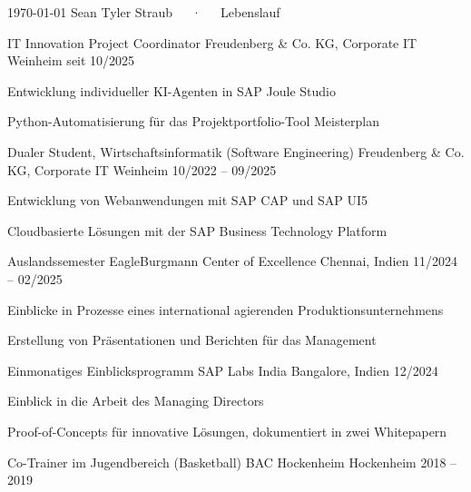 \documentclass[11pt, a4paper]{awesome-cv}
\begin{document}
\makecvheader[C]

\makecvfooter
  {\today}
  {Sean Tyler Straub~~~·~~~Lebenslauf}
  {\thepage}


\begin{cventries}

\cventry
  {IT Innovation Project Coordinator}
  {Freudenberg \& Co. KG, Corporate IT}
  {Weinheim}
  {seit 10/2025}
  {
    \begin{cvitems}
      \item {Entwicklung individueller KI-Agenten in SAP Joule Studio}
      \item {Python-Automatisierung für das Projektportfolio-Tool Meisterplan}
    \end{cvitems}
  }

\cventry
  {Dualer Student, Wirtschaftsinformatik (Software Engineering)}
  {Freudenberg \& Co. KG, Corporate IT}
  {Weinheim}
  {10/2022 -- 09/2025}
  {
    \begin{cvitems}
      \item {Entwicklung von Webanwendungen mit SAP CAP und SAP UI5}
      \item {Cloudbasierte Lösungen mit der SAP Business Technology Platform}
    \end{cvitems}
  }

\cventry
  {Auslandssemester}
  {EagleBurgmann Center of Excellence}
  {Chennai, Indien}
  {11/2024 -- 02/2025}
  {
    \begin{cvitems}
      \item {Einblicke in Prozesse eines international agierenden Produktionsunternehmens}
      \item {Erstellung von Präsentationen und Berichten für das Management}
    \end{cvitems}
  }

\cventry
  {Einmonatiges Einblicksprogramm}
  {SAP Labs India}
  {Bangalore, Indien}
  {12/2024}
  {
    \begin{cvitems}
      \item {Einblick in die Arbeit des Managing Directors}
      \item {Proof-of-Concepts für innovative Lösungen, dokumentiert in zwei Whitepapern}
    \end{cvitems}
  }

\cventry
  {Co-Trainer im Jugendbereich (Basketball)}
  {BAC Hockenheim}
  {Hockenheim}
  {2018 -- 2019}
  {}

\end{cventries}
\end{document}
